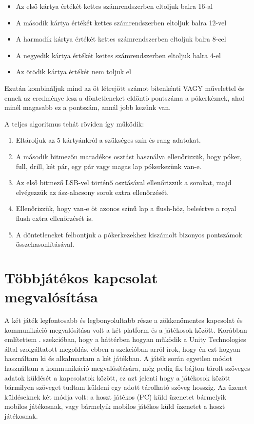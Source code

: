 \documentclass[]{thesis-ekf}
\theoremstyle{definition}
\theoremstyle{remark}
\begin{document}
\begin{enumerate}
\begin{itemize}
		\begin{itemize}
			\item Az első kártya értékét kettes számrendszerben eltoljuk balra 16-al
			\item A második kártya értékét kettes számrendszerben eltoljuk balra 12-vel
			\item A harmadik kártya értékét kettes számrendszerben eltoljuk balra 8-cel
			\item A negyedik kártya értékét kettes számrendszerben eltoljuk balra 4-el
			\item Az ötödik kártya értékét nem toljuk el
		\end{itemize}  
		Ezután kombináljuk mind az öt létrejött számot bitenkénti VAGY művelettel és ennek az eredménye lesz a döntetleneket eldöntő pontszáma a pókerkéznek, ahol minél magasabb ez a pontszám, annál jobb kezünk van.
	\end{itemize}
	
\end{enumerate}

A teljes algoritmus tehát röviden így működik:

\begin{enumerate}
	\item Eltároljuk az 5 kártyánkról a szükséges szín és rang adatokat.
	\item A második bitmezőn maradékos osztást használva ellenőrizzük, hogy póker, full, drill, két pár, egy pár vagy magas lap pókerkezünk van-e.
	\item Az első bitmező LSB-vel történő osztásával ellenőrizzük a sorokat, majd elvégezzük az ász-alacsony sorok extra ellenőrzését.
	\item Ellenőrizzük, hogy van-e öt azonos színű lap a flush-höz, beleértve a royal flush extra ellenőrzését is.
	\item A döntetleneket felbontjuk a pókerkezekhez kiszámolt bizonyos pontszámok összehasonlításával.
\end{enumerate}

\section{Többjátékos kapcsolat megvalósítása}
\label{sec-tobbjatekoskapcsolat}

A két játék legfontosabb és legbonyolultabb része a zökkenőmentes kapcsolat és kommunikáció megvalósítása volt a két platform és a játékosok között. Korábban említettem . szekcióban, hogy a háttérben hogyan működik a Unity Technologies által szolgáltatott megoldás, ebben a szekcióban arról írok, hogy én ezt hogyan használtam ki és alkalmaztam a két játékban. A játék során egyetlen módot használtam a kommunikáció megvalósítására, még pedig fix bájton tárolt szöveges adatok küldését a kapcsolatok között, ez azt jelenti hogy a játékosok között bármilyen szöveget tudtam küldeni egy adott tárolható szöveg hosszig. Az üzenet küldéseknek két módja volt: a hoszt játékos (PC) küld üzenetet bármelyik mobilos játékosnak, vagy bármelyik mobilos játékos küld üzenetet a hoszt játékosnak.
\end{document}
